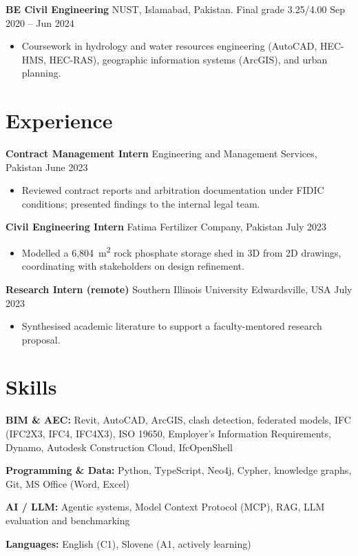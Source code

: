 \documentclass[a4paper,10.5pt]{article}
\newcommand{\datefill}{\dotfill}
\newcommand{\entry}[3]{\vspace{2.5pt}\noindent\textbf{#1} \textbar{} #2 \datefill{} #3\par\vspace{0.5pt}}
\newcommand{\skillrow}[2]{\noindent\textbf{#1:} #2\par\vspace{1pt}}
\begin{document}
\entry{BE Civil Engineering}{NUST, Islamabad, Pakistan. Final grade 3.25/4.00}{Sep 2020 -- Jun 2024}
\begin{itemize}
  \item Coursework in hydrology and water resources engineering (AutoCAD, HEC-HMS,
        HEC-RAS), geographic information systems (ArcGIS), and urban planning.
\end{itemize}

\section{Experience}
\entry{Contract Management Intern}{Engineering and Management Services, Pakistan}{June 2023}
\begin{itemize}
  \item Reviewed contract reports and arbitration documentation under FIDIC
        conditions; presented findings to the internal legal team.
\end{itemize}

\entry{Civil Engineering Intern}{Fatima Fertilizer Company, Pakistan}{July 2023}
\begin{itemize}
  \item Modelled a 6,804~m\textsuperscript{2} rock phosphate storage shed in 3D from
        2D drawings, coordinating with stakeholders on design refinement.
\end{itemize}

\entry{Research Intern (remote)}{Southern Illinois University Edwardsville, USA}{July 2023}
\begin{itemize}
  \item Synthesised academic literature to support a faculty-mentored research proposal.
\end{itemize}

\section{Skills}

\skillrow{BIM \& AEC}{Revit, AutoCAD, ArcGIS, clash detection, federated models, IFC (IFC2X3, IFC4, IFC4X3), ISO 19650, Employer's Information Requirements, Dynamo, Autodesk Construction Cloud, IfcOpenShell}
\skillrow{Programming \& Data}{Python, TypeScript, Neo4j, Cypher, knowledge graphs, Git, MS Office (Word, Excel)}
\skillrow{AI / LLM}{Agentic systems, Model Context Protocol (MCP), RAG, LLM evaluation and benchmarking}

\skillrow{Languages}{English (C1), Slovene (A1, actively learning)}
\end{document}
